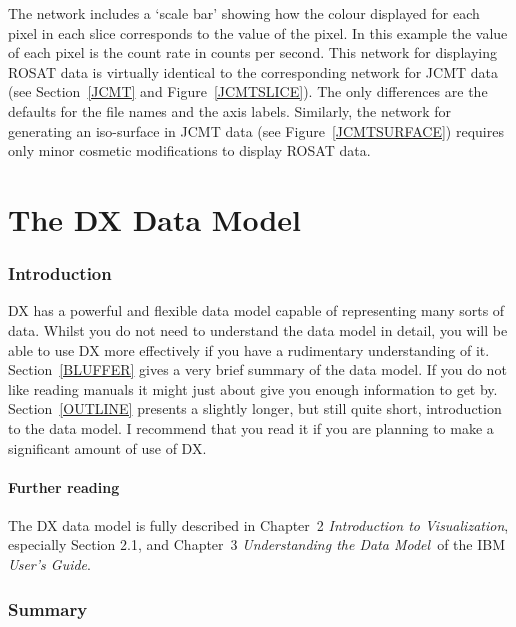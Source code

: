 \begin{enumerate}
\begin{enumerate}
  \end{enumerate}

   The network includes a `scale bar' showing how the colour displayed
   for each pixel in each slice corresponds to the value of the pixel.
   In this example the value of each pixel is the count rate in counts
   per second.  This network for displaying ROSAT data is virtually
   identical to the corresponding network for JCMT data (see
   Section~\ref{JCMT} and Figure~\ref{JCMTSLICE}).  The only differences
   are the defaults for the file names and the axis labels.  Similarly,
   the network for generating an iso-surface in JCMT data (see
   Figure~\ref{JCMTSURFACE}) requires only minor cosmetic modifications
   to display ROSAT data.

\end{enumerate}


\cleardoublepage
\markboth{\stardocname}{\stardocname}
\part{The DX Data Model}
\markboth{\stardocname}{\stardocname}
\section{Introduction}

DX has a powerful and flexible data model capable of representing many
sorts of data. Whilst you do not need to understand the data model in
detail, you will be able to use DX more effectively if you have a
rudimentary understanding of it. Section~\ref{BLUFFER} gives a very
brief summary of the data model. If you do not like reading manuals
it might just about give you enough information to get by.
Section~\ref{OUTLINE} presents a slightly longer, but still quite short,
introduction to the data model. I recommend that you read it if you are
planning to make a significant amount of use of DX.

\subsection{Further reading}

The DX data model is fully described in Chapter~2 {\it Introduction
to Visualization}, especially Section 2.1, and Chapter~3 {\it Understanding
the Data Model}\, of the IBM {\it User's Guide}\cite{USERG}.


\section{\label{BLUFFER}Summary}


